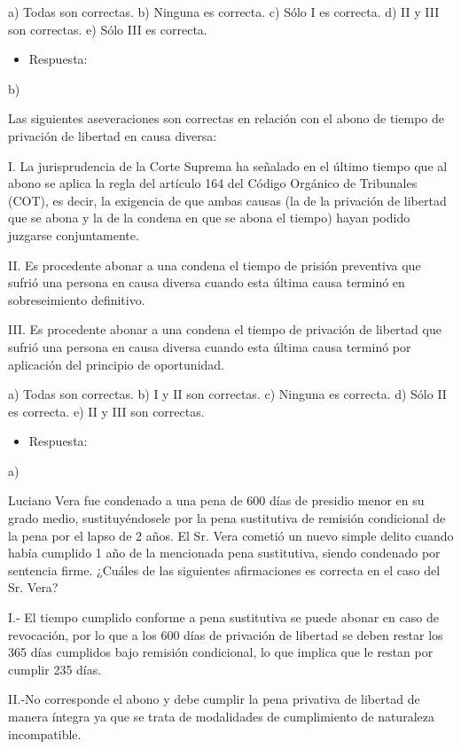 \documentclass[letterpaper, 11pt]{article}
\begin{document}
a) Todas son correctas.
b) Ninguna es correcta.
c) Sólo I es correcta.
d) II y III son correctas.
e) Sólo III es correcta.

\begin{itemize}
\item Respuesta:
\end{itemize}
b)

Las siguientes aseveraciones son correctas en relación con el abono de tiempo de
privación de libertad en causa diversa:

I. La jurisprudencia de la Corte Suprema ha señalado en el último tiempo que al
abono se aplica la regla del artículo 164 del Código Orgánico de Tribunales (COT),
es decir, la exigencia de que ambas causas (la de la privación de libertad que se
abona y la de la condena en que se abona el tiempo) hayan podido juzgarse
conjuntamente.

II. Es procedente abonar a una condena el tiempo de prisión preventiva que sufrió
una persona en causa diversa cuando esta última causa terminó en sobreseimiento
definitivo.

III. Es procedente abonar a una condena el tiempo de privación de libertad que sufrió
una persona en causa diversa cuando esta última causa terminó por aplicación del
principio de oportunidad.

a) Todas son correctas.
b) I y II son correctas.
c) Ninguna es correcta.
d) Sólo II es correcta.
e) II y III son correctas.

\begin{itemize}
\item Respuesta:
\end{itemize}
a)

Luciano Vera fue condenado a una pena de 600 días de presidio menor en su grado
medio, sustituyéndosele por la pena sustitutiva de remisión condicional de la pena
por el lapso de 2 años. El Sr. Vera cometió un nuevo simple delito cuando había
cumplido 1 año de la mencionada pena sustitutiva, siendo condenado por
sentencia firme. ¿Cuáles de las siguientes afirmaciones es correcta en el caso del
Sr. Vera?

I.- El tiempo cumplido conforme a pena sustitutiva se puede abonar en caso de
revocación, por lo que a los 600 días de privación de libertad se deben restar los
365 días cumplidos bajo remisión condicional, lo que implica que le restan por
cumplir 235 días.

II.-No corresponde el abono y debe cumplir la pena privativa de libertad de manera
íntegra ya que se trata de modalidades de cumplimiento de naturaleza
incompatible.
\end{document}
